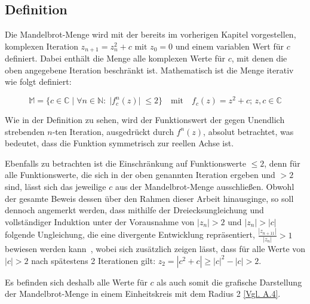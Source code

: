 \subsection{Definition}\label{subsec:definition}

Die Mandelbrot-Menge wird mit der bereits im vorherigen Kapitel vorgestellen,
komplexen Iteration $z_{n+1} = z_n^2 + c \text{ mit } z_0 = 0$ und einem variablen
Wert für $c$~\cite*[S.477ff.]{weitz_konkrete_2018} definiert.
Dabei enthält die Menge alle komplexen Werte für $c$, mit denen die
oben angegebene Iteration beschränkt ist.
Mathematisch ist die Menge iterativ wie folgt definiert:

\begin{equation}\label{eq:mathematical-definition}
  \mathbb{M} = \{c \in \mathbb{C} \; |\;  \forall n \in \mathbb{N}:\; |f_c^n(z)|\; \leqslant 2\}
  \quad
  \text{mit}
  \quad
  f_c(z) = z^2 + c;\, z,c \in \mathbb{C}
\end{equation}

Wie in der Definition zu sehen, wird der Funktionswert der
gegen Unendlich strebenden $n$-ten Iteration, ausgedrückt durch $f^n(z)$,
absolut betrachtet, was bedeutet, dass die Funktion symmetrisch zur reellen Achse ist.

Ebenfalls zu betrachten ist die Einschränkung auf Funktionswerte $\leqslant 2$, denn
für alle Funktionswerte, die sich in der oben genannten Iteration ergeben
und $> 2$ sind, lässt sich das jeweilige $c$ aus der Mandelbrot-Menge
ausschließen.
Obwohl der gesamte Beweis dessen über den Rahmen dieser Arbeit hinausginge,
so soll dennoch angemerkt werden, dass mithilfe der Dreiecksungleichung und
vollständiger Induktion unter der Vorausnahme von $|z_n| > 2 \text{ und } |z_n| > |c|$
folgende Ungleichung, die eine divergente Entwicklung repräsentiert,
$\frac{|z_{n+11}|}{|z_n|} > 1$ bewiesen werden kann~\cite{munafo_escape_1997},
wobei sich zusätzlich zeigen lässt, dass für alle Werte von $|c| > 2$
nach spätestens 2 Iterationen gilt: $z_2 = |c^2 + c| \geqslant |c|^2 - |c| > 2$.

Es befinden sich deshalb alle Werte für $c$ als auch somit die grafische Darstellung
der Mandelbrot-Menge in einem Einheitskreis mit dem Radius 2 \hyperref[app:4]{[Vgl. A.4]}.